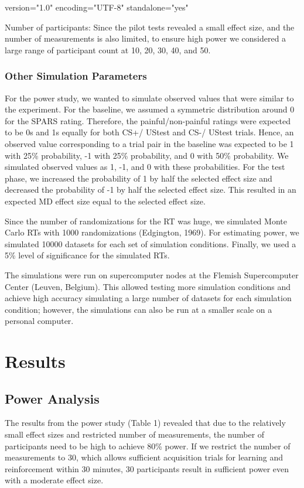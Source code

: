 version="1.0" encoding="UTF-8" standalone="yes" \documentclass{article}
\begin{document}
Number of participants: Since the pilot tests revealed a small effect size, and the number of measurements is also limited, to ensure high power we considered a large range of participant count at 10, 20, 30, 40, and 50. 

\subsubsection{Other Simulation Parameters}

For the power study, we wanted to simulate observed values that were similar to the experiment. For the baseline, we assumed a symmetric distribution around 0 for the SPARS rating. Therefore, the painful/non-painful ratings were expected to be 0s and 1s equally for both CS+/ UStest and CS-/ UStest trials. Hence, an observed value corresponding to a trial pair in the baseline was expected to be 1 with 25\% probability, -1 with 25\% probability, and 0 with 50\% probability. We simulated observed values as 1, -1, and 0 with these probabilities. For the test phase, we increased the probability of 1 by half the selected effect size and decreased the probability of -1 by half the selected effect size. This resulted in an expected MD effect size equal to the selected effect size. 

Since the number of randomizations for the RT was huge, we simulated Monte Carlo RTs with 1000 randomizations (Edgington, 1969). For estimating power, we simulated 10000 datasets for each set of simulation conditions. Finally, we used a 5\% level of significance for the simulated RTs.

The simulations were run on supercomputer nodes at the Flemish Supercomputer Center (Leuven, Belgium). This allowed testing more simulation conditions and achieve high accuracy simulating a large number of datasets for each simulation condition; however, the simulations can also be run at a smaller scale on a personal computer. 

\section{Results}

\subsection{Power Analysis}

The results from the power study (Table 1) revealed that due to the relatively small effect sizes and restricted number of measurements, the number of participants need to be high to achieve 80\% power. If we restrict the number of measurements to 30, which allows sufficient acquisition trials for learning and reinforcement within 30 minutes, 30 participants result in sufficient power even with a moderate effect size. 
\end{document}
